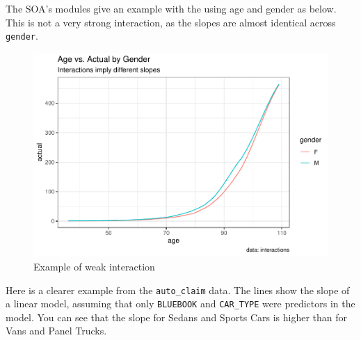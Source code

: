 \documentclass[]{book}
\newenvironment{Shaded}{\begin{snugshade}}{\end{snugshade}}
\newcommand{\DataTypeTok}[1]{\textcolor[rgb]{0.13,0.29,0.53}{#1}}
\newcommand{\KeywordTok}[1]{\textcolor[rgb]{0.13,0.29,0.53}{\textbf{#1}}}
\newcommand{\NormalTok}[1]{#1}
\newcommand{\OperatorTok}[1]{\textcolor[rgb]{0.81,0.36,0.00}{\textbf{#1}}}
\newcommand{\StringTok}[1]{\textcolor[rgb]{0.31,0.60,0.02}{#1}}
\begin{document}
The SOA's modules give an example with the using age and gender as below. This is not a very strong interaction, as the slopes are almost identical across \texttt{gender}.

\begin{Shaded}
\end{Shaded}

\begin{figure}
\centering
\includegraphics{Exam-PA-Study-Manual_files/figure-latex/unnamed-chunk-97-1.pdf}
\caption{\label{fig:unnamed-chunk-97}Example of weak interaction}
\end{figure}

Here is a clearer example from the \texttt{auto\_claim} data. The lines show the slope of a linear model, assuming that only \texttt{BLUEBOOK} and \texttt{CAR\_TYPE} were predictors in the model. You can see that the slope for Sedans and Sports Cars is higher than for Vans and Panel Trucks.
\end{document}
